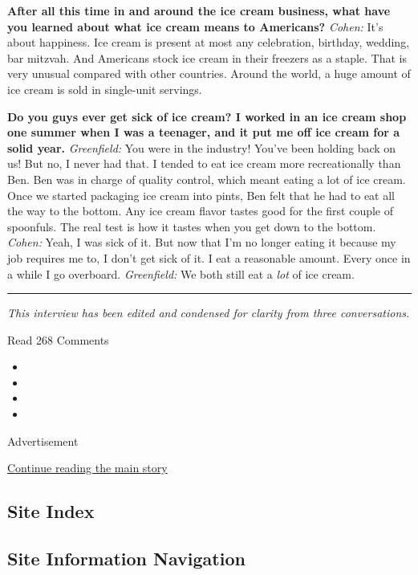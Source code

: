 \textbf{After all this time in and around the ice cream business, what
have you learned about what ice cream means to Americans?} \emph{Cohen:}
It's about happiness. Ice cream is present at most any celebration,
birthday, wedding, bar mitzvah. And Americans stock ice cream in their
freezers as a staple. That is very unusual compared with other
countries. Around the world, a huge amount of ice cream is sold in
single-unit servings.

\textbf{Do you guys ever get sick of ice cream? I worked in an ice cream
shop one summer when I was a teenager, and it put me off ice cream for a
solid year.} \emph{Greenfield:} You were in the industry! You've been
holding back on us! But no, I never had that. I tended to eat ice cream
more recreationally than Ben. Ben was in charge of quality control,
which meant eating a lot of ice cream. Once we started packaging ice
cream into pints, Ben felt that he had to eat all the way to the bottom.
Any ice cream flavor tastes good for the first couple of spoonfuls. The
real test is how it tastes when you get down to the bottom.
\emph{Cohen:} Yeah, I was sick of it. But now that I'm no longer eating
it because my job requires me to, I don't get sick of it. I eat a
reasonable amount. Every once in a while I go overboard.
\emph{Greenfield:} We both still eat a \emph{lot} of ice cream.

\begin{center}\rule{0.5\linewidth}{\linethickness}\end{center}

\emph{This interview has been edited and condensed for clarity from
three conversations.}

Read 268 Comments

\begin{itemize}
\item
\item
\item
\item
\end{itemize}

Advertisement

\protect\hyperlink{after-bottom}{Continue reading the main story}

\hypertarget{site-index}{%
\subsection{Site Index}\label{site-index}}

\hypertarget{site-information-navigation}{%
\subsection{Site Information
Navigation}\label{site-information-navigation}}

